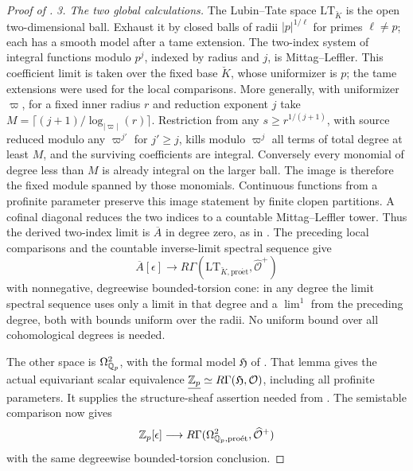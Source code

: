 \begin{proof}[Proof of ]
\medskip\noindent\emph{3. The two global calculations.} The Lubin--Tate space
$\mathrm{LT}_{\breve K}$ is the open two-dimensional ball.
Exhaust it by closed balls of radii $|p|^{1/\ell}$ for primes
$\ell\ne p$; each has a smooth model after a tame extension.
The two-index system of integral functions modulo $p^j$, indexed
by radius and $j$, is Mittag--Leffler.  This coefficient limit is
taken over the fixed base $\breve K$, whose uniformizer is $p$;
the tame extensions were used for the local comparisons.  More
generally, with uniformizer $\varpi$, for a fixed inner radius $r$
and reduction exponent $j$ take
$M=\lceil(j+1)/\log_{|\varpi|}(r)\rceil$.  Restriction from any
$s\geq r^{1/(j+1)}$, with source reduced modulo any
$\varpi^{j'}$ for $j'\geq j$, kills modulo $\varpi^j$ all terms of
total degree at least $M$, and the surviving coefficients are
integral.  Conversely every monomial of degree less than $M$ is
already integral on the larger ball.  The image is therefore the
fixed module spanned by those monomials.  Continuous functions from a
profinite parameter preserve this image statement by finite clopen
partitions.  A cofinal diagonal reduces the two indices to a
countable Mittag--Leffler tower.  Thus the derived two-index limit is
$\overline A$ in degree zero, as in
\cite[Lemmas~6.1.2--6.1.3]{BSSW}.  The preceding local comparisons
and the countable inverse-limit spectral sequence give
\[
 \overline A[\epsilon]\longrightarrow
 R\Gamma(\mathrm{LT}_{\breve K,\mathrm{pro\acute et}},
          \widehat{\mathcal O}^{+})
\]
with nonnegative, degreewise bounded-torsion cone: in any degree
the limit spectral sequence uses only a limit in that degree and
a $\lim^1$ from the preceding degree, both with bounds uniform
over the radii.  No uniform bound over all cohomological degrees is needed.

The other space is $\Omega^2_{\mathbb Q_p}$, with the formal model
$\mathfrak H$ of .  That lemma
gives the actual equivariant scalar equivalence
$\underline{\mathbb Z_p}\simeq R\Gamma(\mathfrak H,\mathcal O)$, including
all profinite parameters.  It supplies the structure-sheaf assertion
needed from \cite[Theorem~6.2.1]{BSSW}.
The semistable comparison now gives
\[
 \mathbb Z_p[\epsilon]\longrightarrow
 R\Gamma(\Omega^2_{\mathbb Q_p,\mathrm{pro\acute et}},
          \widehat{\mathcal O}^{+})
\]
with the same degreewise bounded-torsion conclusion.


\end{proof}
